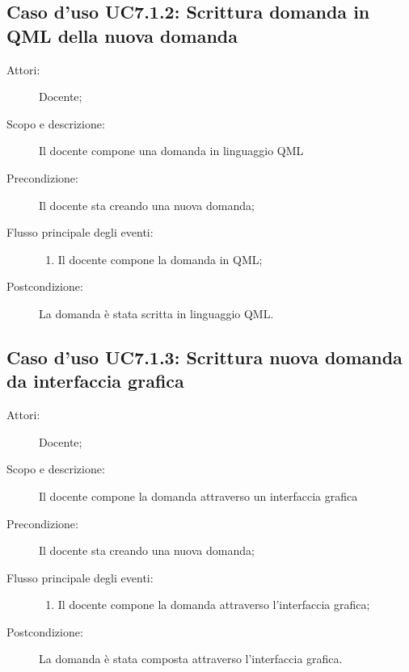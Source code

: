 \subsection{Caso d'uso UC7.1.2: Scrittura domanda in QML della nuova domanda}\begin{description}
\item[Attori:] Docente;
\item[Scopo e descrizione:] Il docente compone una domanda in linguaggio QML
      \item[Precondizione:] Il docente sta creando una nuova domanda;

        \item[Flusso principale degli eventi:] \begin{enumerate}
          \item Il docente compone la domanda in QML;

      \end{enumerate}
    \item[Postcondizione:] La domanda è stata scritta in linguaggio QML.
  \end{description}
\hypertarget{UC7.1.3}{}
\subsection{Caso d'uso UC7.1.3: Scrittura nuova domanda da interfaccia grafica}\begin{description}
\item[Attori:] Docente;
\item[Scopo e descrizione:] Il docente compone la domanda attraverso un interfaccia grafica
      \item[Precondizione:] Il docente sta creando una nuova domanda;

        \item[Flusso principale degli eventi:] \begin{enumerate}
          \item Il docente compone la domanda attraverso l'interfaccia grafica;

      \end{enumerate}
    \item[Postcondizione:] La domanda è stata composta attraverso l'interfaccia grafica.
  \end{description}
\hypertarget{UC7.2}{}
